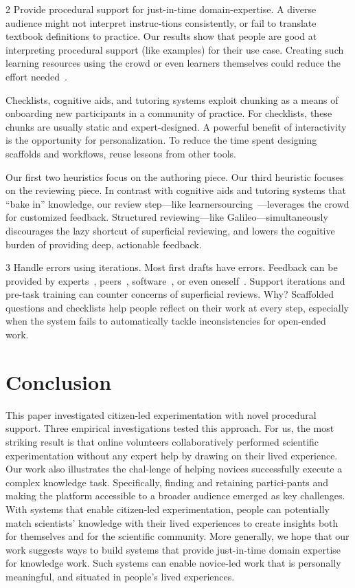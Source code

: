 2 Provide procedural support for just-in-time domain-expertise. A diverse audience might not interpret instruc-tions consistently, or fail to translate textbook definitions to practice. Our results show that people are good at interpreting procedural support (like examples) for their use case. Creating such learning resources using the crowd or even learners themselves could reduce the effort needed~\cite{Kim2014c}. 

Checklists, cognitive aids, and tutoring systems exploit chunking as a means of onboarding new participants in a community of practice. For checklists, these chunks are usually static and expert-designed. A powerful benefit of interactivity is the opportunity for personalization. To reduce the time spent designing scaffolds and workflows, reuse lessons from other tools.
 
Our first two heuristics focus on the authoring piece. Our third heuristic focuses on the reviewing piece. In contrast with cognitive aids and tutoring systems that “bake in” knowledge, our review step—like learnersourcing~\cite{Kim2014c}—leverages the crowd for customized feedback. Structured reviewing—like Galileo—simultaneously discourages the lazy shortcut of superficial reviewing, and lowers the cognitive burden of providing deep, actionable feedback. 

3 Handle errors using iterations. Most first drafts have errors. Feedback can be provided by experts~\cite{dow2012shepherding, schon1984reflective}, peers~\cite{Boud1995, Kulkarni2015b}, software~\cite{Dantoni2015}, or even oneself~\cite{Boud1995, schon1984reflective}. Support iterations and pre-task training can counter concerns of superficial reviews. Why? Scaffolded questions and checklists help people reflect on their work at every step, especially when the system fails to automatically tackle inconsistencies for open-ended work.

\section{Conclusion}
This paper investigated citizen-led experimentation with novel procedural support. Three empirical investigations tested this approach. For us, the most striking result is that online volunteers collaboratively performed scientific experimentation without any expert help by drawing on their lived experience. Our work also illustrates the chal-lenge of helping novices successfully execute a complex knowledge task. Specifically, finding and retaining partici-pants and making the platform accessible to a broader audience emerged as key challenges. With systems that enable citizen-led experimentation, people can potentially match scientists’ knowledge with their lived experiences to create insights both for themselves and for the scientific community. More generally, we hope that our work suggests ways to build systems that provide just-in-time domain expertise for knowledge work. Such systems can enable novice-led work that is personally meaningful, and situated in people’s lived experiences.

